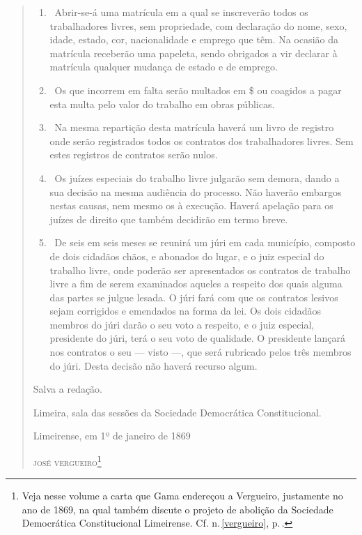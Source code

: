 \begin{quote}
\begin{enumerate}[label=Art. \arabic*º]
\begin{enumerate}[label=§ \arabic*º]
\item\ Abrir-se-á uma matrícula em a qual se inscreverão todos os
trabalhadores livres, sem propriedade, com declaração do nome, sexo,
idade, estado, cor, nacionalidade e emprego que têm. Na ocasião da
matrícula receberão uma papeleta, sendo obrigados a vir declarar à
matrícula qualquer mudança de estado e de emprego.

\item\ Os que incorrem em falta serão multados em \$ ou coagidos a pagar
esta multa pelo valor do trabalho em obras públicas.

\item\ Na mesma repartição desta matrícula haverá um livro de registro
onde serão registrados todos os contratos dos trabalhadores livres. Sem
estes registros de contratos serão nulos.

\item\ Os juízes especiais do trabalho livre julgarão sem demora, dando a
sua decisão na mesma audiência do processo. Não haverão embargos nestas
causas, nem mesmo os à execução. Haverá apelação para os juízes de
direito que também decidirão em termo breve.

\item\ De seis em seis meses se reunirá um júri em cada município,
composto de dois cidadãos chãos, e abonados do lugar, e o juiz especial
do trabalho livre, onde poderão ser apresentados os contratos de
trabalho livre a fim de serem examinados aqueles a respeito dos quais
alguma das partes se julgue lesada. O júri fará com que os contratos
lesivos sejam corrigidos e emendados na forma da lei. Os dois cidadãos
membros do júri darão o seu voto a respeito, e o juiz especial,
presidente do júri, terá o seu voto de qualidade. O presidente lançará
nos contratos o seu --- visto ---, que será rubricado pelos três
membros do júri. Desta decisão não haverá recurso algum.
\end{enumerate}
\end{enumerate}

Salva a redação.

Limeira, sala das sessões da Sociedade Democrática Constitucional.\medskip

\hfill{}Limeirense, em 1º de janeiro de 1869

\hfill\textsc{josé vergueiro}\footnote{Veja nesse volume a carta que Gama endereçou a
  Vergueiro, justamente no ano de 1869, na qual também discute o %
  projeto de abolição da Sociedade Democrática Constitucional
  Limeirense. Cf. n.\,\ref{vergueiro}, p.\,\pageref{vergueiro}.}
  \end{quote}


